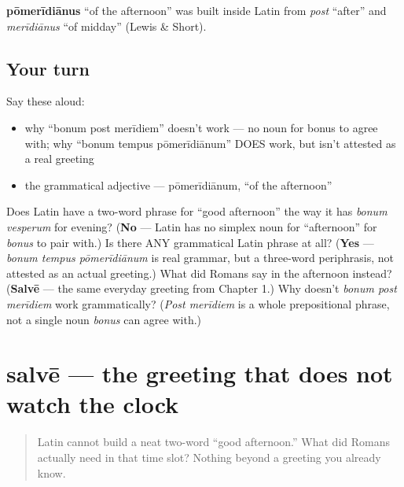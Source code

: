 \begin{cousinweb}
\textbf{pōmerīdiānus} \textquotedblleft{}of the afternoon\textquotedblright{} was built inside Latin from \emph{post} \textquotedblleft{}after\textquotedblright{} and \emph{merīdiānus} \textquotedblleft{}of midday\textquotedblright{} (Lewis \& Short).
\end{cousinweb}

\subsection*{Your turn}
Say these aloud:

\begin{itemize}
\raggedright
  \item why \textquotedblleft{}bonum post merīdiem\textquotedblright{} doesn't work — no noun for bonus to agree with; why \textquotedblleft{}bonum tempus pōmerīdiānum\textquotedblright{} DOES work, but isn't attested as a real greeting
  \item the grammatical adjective — pōmerīdiānum, \textquotedblleft{}of the afternoon\textquotedblright{}
\end{itemize}

\begin{tcolorbox}[breakable,colback=teal!4,colframe=teal!35!black,title={Before you move on}]
Does Latin have a two-word phrase for \textquotedblleft{}good afternoon\textquotedblright{} the way it has \emph{bonum vesperum} for evening? (\textbf{No} — Latin has no simplex noun for \textquotedblleft{}afternoon\textquotedblright{} for \emph{bonus} to pair with.) Is there ANY grammatical Latin phrase at all? (\textbf{Yes} — \emph{bonum tempus pōmerīdiānum} is real grammar, but a three-word periphrasis, not attested as an actual greeting.) What did Romans say in the afternoon instead? (\textbf{Salvē} — the same everyday greeting from Chapter 1.) Why doesn't \emph{bonum post merīdiem} work grammatically? (\emph{Post merīdiem} is a whole prepositional phrase, not a single noun \emph{bonus} can agree with.)
\end{tcolorbox}
\section[salvē / salvēte]{salvē — the greeting that does not watch the clock}

\label{lesson:LA-C36-timeless-salve}



\begin{quote}
Latin cannot build a neat two-word \textquotedblleft{}good afternoon.\textquotedblright{} What did Romans actually need in that time slot? Nothing beyond a greeting you already know.
\end{quote}

